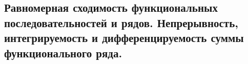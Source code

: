 \subsection{Равномерная сходимость функциональных последовательностей и рядов. Непрерывность, интегрируемость и дифференцируемость суммы функционального ряда.}
